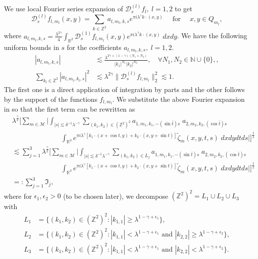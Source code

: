 \documentclass[a4paper,reqno]{amsart}
\theoremstyle{definition}
\theoremstyle{remark}
\numberwithin{equation}{section}
\newcommand{\R}{{\mathbb {R}}}
\newcommand{\N}{{\mathbb N}}
\newcommand{\Z}{{\mathbb Z}}
\begin{document}
	We use local Fourier series expansion of $\mathscr{D}^{(l)}_sf_l,\;l=1,2$ to get
	\[\mathscr{D}^{(l)}_sf_{l,m_l}(x,y)=\sum_{k\in\Z^2}a_{l,m_l,k,s}e^{\pi i\lambda^\gamma k\cdot(x,y)}\quad\text{ for }\quad x,y\in Q_{m_l},\]
	where $a_{l,m_l,k,s}=\frac{\lambda^{2\gamma}}{4}\int_{\R^2}\mathscr{D}^{(1)}_sf_{l,m_l}(x,y)e^{\pi i\lambda^\gamma k\cdot(x,y)}\;dxdy$. We have the following uniform bounds in $s$ for the coefficients $a_{l,m_l,k,s},\;l=1,2$.
	\begin{align}
		|a_{l,m_l,k,s}|&\lesssim\frac{\lambda^{2\gamma+(1-\gamma)(N_1+N_2)}}{|k_1|^{N_1}|k_2|^{N_2}},\quad\forall N_1,N_2\in\N\cup\{0\},\label{est:coefficient},\\
		\sum_{k_l\in\Z^2}|a_{l,m_l,k_l,s}|^2&\lesssim\lambda^{2\gamma}\|\mathscr{D}^{(l)}_sf_{l,m_l}\|_2^2\lesssim1.\label{est:l2coefficient}
	\end{align}
	The first one is a direct application of integration by parts and the other follows by the support of the functions $f_{l,m_l}$.
	We substitute the above Fourier expansion in  so that the first term can be rewritten as
	\begin{align*}
		&\lambda^\frac{\gamma}{2}\Bigg[\sum_{{m}\in\mathcal{M}}\Bigg|\int_{|s|\lesssim\delta^{-1}\lambda^{-\gamma}}\sum_{(k_1,k_2)\in(\Z^2)^2}a_{1,m_1,k_1,-(\sin\bar{t})s}\;a_{2,m_2,k_2,(\cos\bar{t})s}\\
		&\hspace{3cm}\int_{\R^3}e^{\pi i\lambda^\gamma[k_1\cdot(x+\cos t,y)+k_2\cdot(x,y+\sin t)]}\tilde{\zeta}_m(x,y,t,s)\;dxdydtds\Bigg|\Bigg]^\frac{1}{2}\\
		&\lesssim\sum_{j=1}^3\lambda^\frac{\gamma}{2}\Bigg[\sum_{{m}\in\mathcal{M}}\Bigg|\int_{|s|\lesssim\delta^{-1}\lambda^{-\gamma}}\sum_{(k_1,k_2)\in L_j}a_{1,m_1,k_1,-(\sin\bar{t})s}\;a_{2,m_2,k_2,(\cos\bar{t})s}\\
		&\hspace{3cm}\int_{\R^3}e^{\pi i\lambda^\gamma[k_1\cdot(x+\cos t,y)+k_2\cdot(x,y+\sin t)]}\tilde{\zeta}_m(x,y,t,s)\;dxdydtds\Bigg|\Bigg]^\frac{1}{2}\\
		&=:\sum_{j=1}^3\mathfrak{I}_j,
	\end{align*}
	where for $\epsilon_1,\epsilon_2>0$ (to be chosen later), we decompose $(\Z^2)^2=L_1\cup L_2\cup L_3$ with
	\begin{align*}
		L_1&=\{(k_1,k_2)\in(\Z^2)^2 : |k_{1,1}|\geq\lambda^{1-\gamma+\epsilon_1}\},\\
		L_2&=\{(k_1,k_2)\in(\Z^2)^2 : |k_{1,1}|<\lambda^{1-\gamma+\epsilon_1}\text{ and }|k_{2,2}|\geq\lambda^{1-\gamma+\epsilon_2}\},\\
		L_3&=\{(k_1,k_2)\in(\Z^2)^2 : |k_{1,1}|<\lambda^{1-\gamma+\epsilon_1}\text{ and }|k_{2,2}|<\lambda^{1-\gamma+\epsilon_2}\}.
	\end{align*}	
\end{document}
